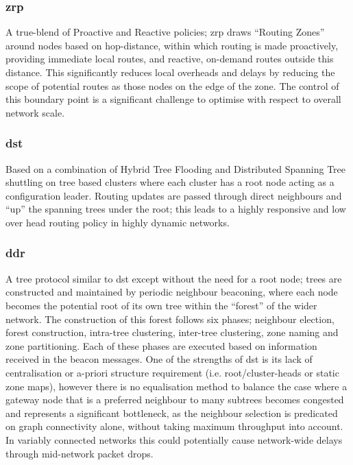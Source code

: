 \subsubsection{\gls{zrp}}
A true-blend of Proactive and Reactive policies; \gls{zrp} draws ``Routing Zones'' around nodes based on hop-distance, within which routing is made proactively, providing immediate local routes, and reactive, on-demand routes outside this distance. This significantly reduces local overheads and delays by reducing the scope of potential routes as those nodes on the edge of the zone. The control of this boundary point is a significant challenge to optimise with respect to overall network scale. \\
\subsubsection{\gls{dst}}
Based on a combination of Hybrid Tree Flooding and Distributed Spanning Tree shuttling on tree based clusters where each cluster has a root node acting as a configuration leader. Routing updates are passed through direct neighbours and ``up'' the spanning trees under the root; this leads to a highly responsive and low over head routing policy in highly dynamic networks.\cite{Radhakrishnan1999}\\
\subsubsection{\gls{ddr}} 
A tree protocol similar to \gls{dst} except without the need for a root node; trees are constructed and maintained by periodic neighbour beaconing, where each node becomes the potential root of its own tree within the ``forest'' of the wider network. The construction of this forest follows six phases; neighbour election, forest construction, intra-tree clustering, inter-tree clustering, zone naming and zone partitioning. Each of these phases are executed based on information received in the beacon messages. One of the strengths of \gls{dst} is its lack of centralisation or a-priori structure requirement (i.e. root/cluster-heads or static zone maps), however there is no equalisation method to balance the case where a gateway node that is a preferred neighbour to many subtrees becomes congested and represents a significant bottleneck, as the neighbour selection is predicated on graph connectivity alone, without taking maximum throughput into account. In variably connected networks this could potentially cause network-wide delays through mid-network packet drops.\\
